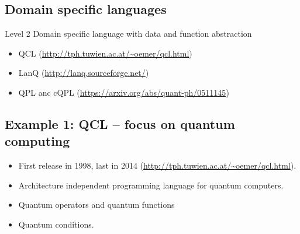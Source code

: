 \documentclass{beamer}
\begin{document}
\subsection{Domain specific languages}

\begin{frame}{\insertsection}{\insertsubsection}

\begin{block}{Level 2}
Domain specific language with data and function abstraction
\end{block}

\begin{itemize}
    \item QCL (\url{http://tph.tuwien.ac.at/~oemer/qcl.html})
    \item LanQ (\url{http://lanq.sourceforge.net/})
    \item QPL anc cQPL (\url{https://arxiv.org/abs/quant-ph/0511145})
\end{itemize}
\end{frame}


\subsection{Example 1: QCL -- focus on quantum computing}

\begin{frame}{\insertsection}{\insertsubsection}
	\begin{itemize}
		\item<1-> First release in 1998, last in 2014 
		(\url{http://tph.tuwien.ac.at/~oemer/qcl.html}).
		\item<2-> Architecture independent programming language for quantum 
		computers.
		\item<3-> Quantum operators and quantum functions
		\item<4-> Quantum conditions.
	\end{itemize}
	
\end{frame}

\begin{frame}{\insertsection}{\insertsubsection}
	
\end{frame}
\end{document}
